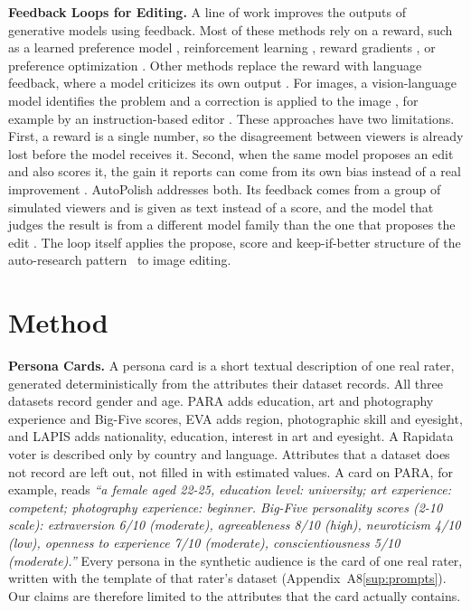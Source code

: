 \documentclass[runningheads]{llncs}
\newcommand{\appref}[2]{\ifdefined\mainonly #2\else\ref{#1}\fi}
\begin{document}
\textbf{Feedback Loops for Editing.} A line of work improves the outputs of generative models using feedback. Most of these methods rely on a reward, such as a learned preference model \cite{xu2023imagereward, kirstain2023pickapic}, reinforcement learning \cite{black2024ddpo, fan2023dpok}, reward gradients \cite{clark2024draft, prabhudesai2023alignprop}, or preference optimization \cite{wallace2024dpo}. Other methods replace the reward with language feedback, where a model criticizes its own output \cite{madaan2023selfrefine, shinn2023reflexion, gou2024critic}. For images, a vision-language model identifies the problem and a correction is applied to the image \cite{wu2024sld, wang2024genartist}, for example by an instruction-based editor \cite{brooks2023instructpix2pix, flux2024}. These approaches have two limitations. First, a reward is a single number, so the disagreement between viewers is already lost before the model receives it. Second, when the same model proposes an edit and also scores it, the gain it reports can come from its own bias instead of a real improvement \cite{xu2024selfbias}. AutoPolish addresses both. Its feedback comes from a group of simulated viewers and is given as text instead of a score, and the model that judges the result is from a different model family than the one that proposes the edit \cite{schuhmann2022, oquab2023}. The loop itself applies the propose, score and keep-if-better structure of the auto-research pattern~\cite{karpathy2026autoresearch} to image editing.


\section{Method}
\label{sec:method}

\textbf{Persona Cards.} A persona card is a short textual description of one real rater, generated deterministically from the attributes their dataset records. All three datasets record gender and age. PARA adds education, art and photography experience and Big-Five scores, EVA adds region, photographic skill and eyesight, and LAPIS adds nationality, education, interest in art and eyesight. A Rapidata voter is described only by country and language. Attributes that a dataset does not record are left out, not filled in with estimated values. A card on PARA, for example, reads \emph{``a female aged 22-25, education level: university; art experience: competent; photography experience: beginner. Big-Five personality scores (2-10 scale): extraversion 6/10 (moderate), agreeableness 8/10 (high), neuroticism 4/10 (low), openness to experience 7/10 (moderate), conscientiousness 5/10 (moderate).''} Every persona in the synthetic audience is the card of one real rater, written with the template of that rater's dataset (Appendix~\appref{sup:prompts}{A8}). Our claims are therefore limited to the attributes that the card actually contains.
\end{document}
